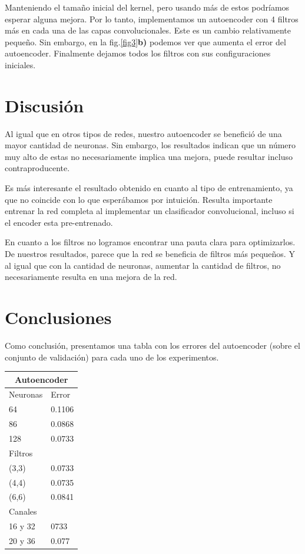 \documentclass[aps,prl,twocolumn,groupedaddress]{revtex4-2}
\begin{document}
Manteniendo el tamaño inicial del kernel, pero usando más de estos podríamos esperar alguna mejora. Por lo tanto, implementamos un autoencoder con 4 filtros más en cada una de las capas convolucionales. Este es un cambio relativamente pequeño. Sin embargo, en la fig.\ref{fig3}\textbf{b)} podemos ver que aumenta el error del autoencoder. Finalmente dejamos todos los filtros con sus configuraciones iniciales.


\section{Discusión}

Al igual que en otros tipos de redes, nuestro autoencoder se benefició de una mayor cantidad de neuronas. Sin embargo, los resultados indican que un número muy alto de estas no necesariamente implica una mejora, puede resultar incluso contraproducente.

Es más interesante el resultado obtenido en cuanto al tipo de entrenamiento, ya que no coincide con lo que esperábamos por intuición. Resulta importante entrenar la red completa al implementar un clasificador convolucional, incluso si el encoder esta pre-entrenado.

En cuanto a los filtros no logramos encontrar una pauta clara para optimizarlos. De nuestros resultados, parece que la red se beneficia de filtros más pequeños. Y al igual que con la cantidad de neuronas, aumentar la cantidad de filtros, no necesariamente resulta en una mejora de la red.


\section{Conclusiones}
Como conclusión, presentamos una tabla con los errores del autoencoder (sobre el conjunto de validación) para cada uno de los experimentos.
\\
\begin{center}
\begin{tabular}{ |p{3cm}|p{3cm}| }
 \hline
 \multicolumn{2}{|c|}{Autoencoder} \\
 \hline
 Neuronas & Error\\
 \hline
 64 & 0.1106    \\
 86 & 0.0868   \\
 128 & 0.0733 \\
 \hline
 Filtros &\\
 \hline
 (3,3) & 0.0733\\
 (4,4) & 0.0735 \\
 (6,6) & 0.0841\\
 \hline
 Canales &\\
 \hline
 16 y 32 & 0733\\
 20 y 36 & 0.077 \\
 \hline
\end{tabular}
\end{center}
\\
\end{document}
